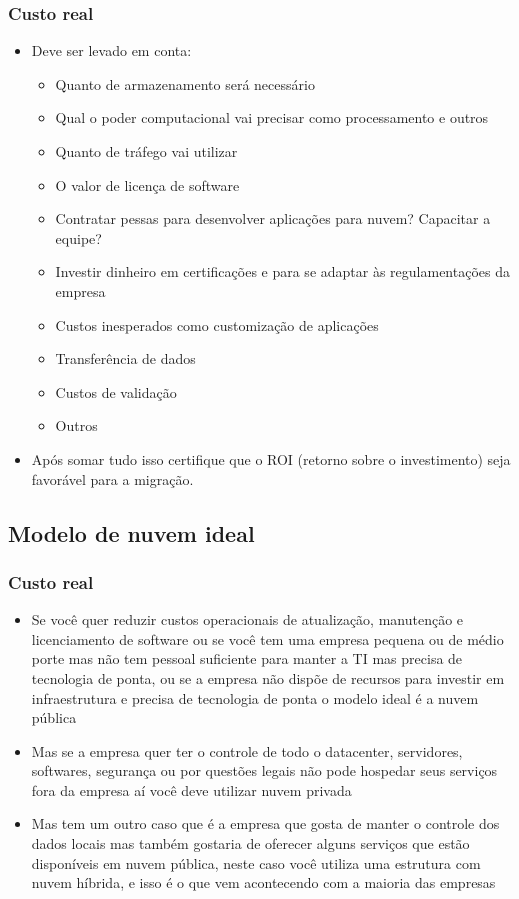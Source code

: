 \begin{frame}
	\frametitle{Custo real}
	\begin{itemize}
		\item Deve ser levado em conta:
		\begin{itemize}
			\item Quanto de armazenamento será necessário
			\item Qual o poder computacional vai precisar como processamento e outros
			\item Quanto de tráfego vai utilizar
			\item O valor de licença de software
			\item Contratar pessas para desenvolver aplicações para nuvem? Capacitar a equipe?
			\item Investir dinheiro em certificações e para se adaptar às regulamentações da empresa
			\item Custos inesperados como customização de aplicações
			\item Transferência de dados
			\item Custos de validação
			\item Outros
		\end{itemize}
		\item Após somar tudo isso certifique que o ROI (retorno sobre o investimento) seja favorável para a migração.
	\end{itemize}
\end{frame}

\subsection{Modelo de nuvem ideal}

\begin{frame}
	\frametitle{Custo real}
	\begin{tiny}
	\begin{itemize}
		\item Se você quer reduzir custos operacionais de atualização, manutenção e licenciamento de software ou se você tem uma empresa pequena ou de médio porte mas não tem pessoal suficiente para manter a TI mas precisa de tecnologia de ponta, ou se a empresa não dispõe de recursos para investir em infraestrutura e precisa de tecnologia de ponta o modelo ideal é a nuvem pública
		\item Mas se a empresa quer ter o controle de todo o datacenter, servidores, softwares, segurança ou por questões legais não pode hospedar seus serviços fora da empresa aí você deve utilizar nuvem privada
		\item Mas tem um outro caso que é a empresa que gosta de manter o controle dos dados locais mas também gostaria de oferecer alguns serviços que estão disponíveis em nuvem pública, neste caso você utiliza uma estrutura com nuvem híbrida, e isso é o que vem acontecendo com a maioria das empresas
	\end{itemize}
	\end{tiny}
\end{frame}

